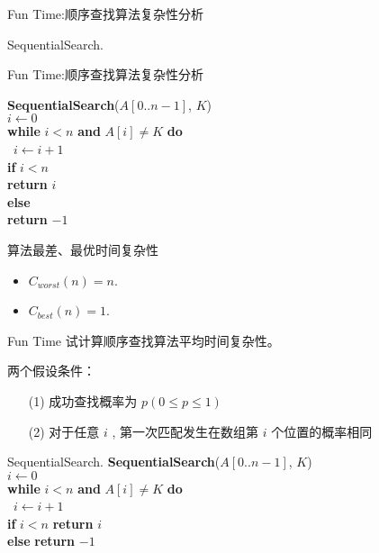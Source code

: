 \documentclass[fontset=fandol,UTF8,12pt,aspectratio=169,fleqn]{beamer}
\begin{document}
\begin{frame}{Fun Time:顺序查找算法复杂性分析}
    \begin{exampleblock}{SequentialSearch.} %
\end{exampleblock}
\end{frame}

\begin{frame}{Fun Time:顺序查找算法复杂性分析}
    \begin{exampleblock}{} %
    \textbf{SequentialSearch}($A[0..n-1]$, $K$)\\
\qquad         $i\gets 0$\\
\qquad \textbf{while} $i< n$ \textbf{and} $A[i]\neq K$ \textbf{do}\\
\qquad\ \qquad  $i\gets i+1$\\
\qquad \textbf{if}  $i < n$ \\
\qquad \qquad \textbf{return} $i$\\
\qquad \textbf{else} \\
\qquad \qquad \textbf{return} $-1$
\end{exampleblock}
\end{frame}



\begin{frame}{算法最差、最优时间复杂性}
\begin{itemize}[<+-|alert@+>]
\item   $C_{worst}(n)=n$.  
\item  $C_{best}(n)=1$. 
\end{itemize}
\end{frame}

\begin{frame}{Fun Time}
  试计算顺序查找算法平均时间复杂性。
\end{frame}

\begin{frame}{}
两个假设条件：
\begin{itemize}[<+-|alert@+>]
\item[(1)] 成功查找概率为 $p(0\leq p\leq 1)$  
\item[(2)] 对于任意 $i$ , 第一次匹配发生在数组第 $i$ 个位置的概率相同  
\end{itemize}
    \begin{exampleblock}{SequentialSearch.} %
    \textbf{SequentialSearch}($A[0..n-1]$, $K$)\\
\qquad         $i\gets 0$\\
\qquad \textbf{while} $i< n$ \textbf{and} $A[i]\neq K$ \textbf{do}\\
\qquad\ \qquad  $i\gets i+1$\\
\qquad \textbf{if} $i < n$ \textbf{return} $i$\\
\qquad \textbf{else} \textbf{return} $-1$
\end{exampleblock}
\end{frame}
\end{document}
